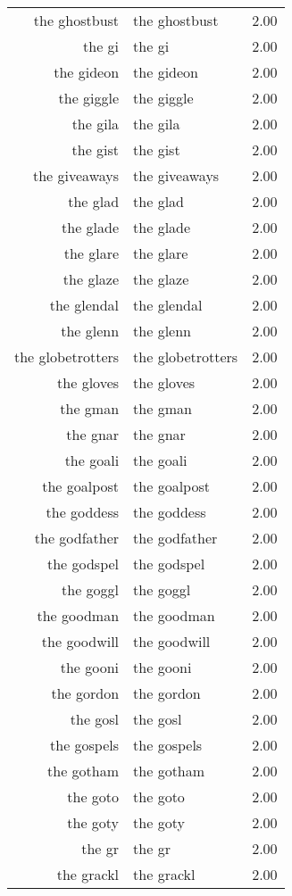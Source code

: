 \begin{table}[ht]
\begin{tabular}{rlr}
  the ghostbust & the ghostbust & 2.00 \\ 
  the gi & the gi & 2.00 \\ 
  the gideon & the gideon & 2.00 \\ 
  the giggle & the giggle & 2.00 \\ 
  the gila & the gila & 2.00 \\ 
  the gist & the gist & 2.00 \\ 
  the giveaways & the giveaways & 2.00 \\ 
  the glad & the glad & 2.00 \\ 
  the glade & the glade & 2.00 \\ 
  the glare & the glare & 2.00 \\ 
  the glaze & the glaze & 2.00 \\ 
  the glendal & the glendal & 2.00 \\ 
  the glenn & the glenn & 2.00 \\ 
  the globetrotters & the globetrotters & 2.00 \\ 
  the gloves & the gloves & 2.00 \\ 
  the gman & the gman & 2.00 \\ 
  the gnar & the gnar & 2.00 \\ 
  the goali & the goali & 2.00 \\ 
  the goalpost & the goalpost & 2.00 \\ 
  the goddess & the goddess & 2.00 \\ 
  the godfather & the godfather & 2.00 \\ 
  the godspel & the godspel & 2.00 \\ 
  the goggl & the goggl & 2.00 \\ 
  the goodman & the goodman & 2.00 \\ 
  the goodwill & the goodwill & 2.00 \\ 
  the gooni & the gooni & 2.00 \\ 
  the gordon & the gordon & 2.00 \\ 
  the gosl & the gosl & 2.00 \\ 
  the gospels & the gospels & 2.00 \\ 
  the gotham & the gotham & 2.00 \\ 
  the goto & the goto & 2.00 \\ 
  the goty & the goty & 2.00 \\ 
  the gr & the gr & 2.00 \\ 
  the grackl & the grackl & 2.00 \\ 

\end{tabular}
\end{table}
